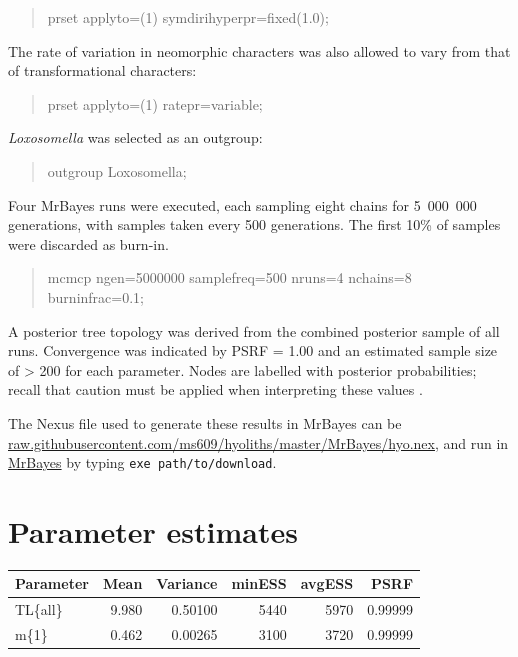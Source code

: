 \documentclass[openany]{book}
\begin{document}
\begin{quote}
prset applyto=(1) symdirihyperpr=fixed(1.0);
\end{quote}

The rate of variation in neomorphic characters was also allowed to vary
from that of transformational characters:

\begin{quote}
prset applyto=(1) ratepr=variable;
\end{quote}

\emph{Loxosomella} was selected as an outgroup:

\begin{quote}
outgroup Loxosomella;
\end{quote}

Four MrBayes runs were executed, each sampling eight chains for
5~000~000 generations, with samples taken every 500 generations. The
first 10\% of samples were discarded as burn-in.

\begin{quote}
mcmcp ngen=5000000 samplefreq=500 nruns=4 nchains=8 burninfrac=0.1;
\end{quote}

A posterior tree topology was derived from the combined posterior sample
of all runs. Convergence was indicated by PSRF = 1.00 and an estimated
sample size of \textgreater{} 200 for each parameter. Nodes are labelled
with posterior probabilities; recall that caution must be applied when
interpreting these values \citep{Yang2018}.

The Nexus file used to generate these results in MrBayes can be
\href{https://raw.githubusercontent.com/ms609/hyoliths/master/MrBayes/hyo.nex}{raw.githubusercontent.com/ms609/hyoliths/master/MrBayes/hyo.nex},
and run in \href{http://mrbayes.sourceforge.net/download.php}{MrBayes}
by typing \texttt{exe\ path/to/download}.

\section{Parameter estimates}\label{parameter-estimates}

\begin{tabular}{l|r|r|r|r|r}
\hline
Parameter & Mean & Variance & minESS & avgESS & PSRF\\
\hline
TL\{all\} & 9.980 & 0.50100 & 5440 & 5970 & 0.99999\\
\hline
m\{1\} & 0.462 & 0.00265 & 3100 & 3720 & 0.99999\\
\hline
\end{tabular}
\end{document}
